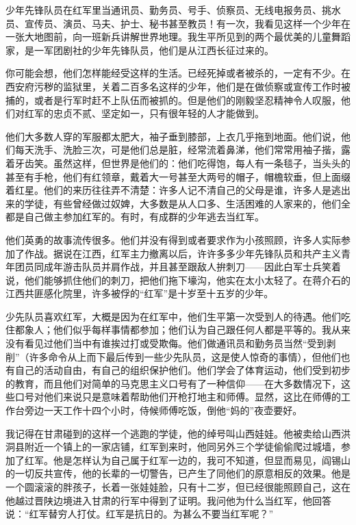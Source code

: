 \documentclass[10pt]{book}
\begin{document}
少年先锋队员在红军里当通讯员、勤务员、号手、侦察员、无线电报务员、挑水员、宣传员、演员、马夫、护士、秘书甚至教员！有一次，我看见这样一个少年在一张大地图前，向一班新兵讲解世界地理。我生平所见到的两个最优美的儿童舞蹈家，是一军团剧社的少年先锋队员，他们是从江西长征过来的。

你可能会想，他们怎样能经受这样的生活。已经死掉或者被杀的，一定有不少。在西安府污秽的监狱里，关着二百多名这样的少年，他们是在做侦察或宣传工作时被捕的，或者是行军时赶不上队伍而被抓的。但是他们的刚毅坚忍精神令人叹服，他们对红军的忠贞不贰、坚定如一，只有很年轻的人才能做到。

他们大多数人穿的军服都太肥大，袖子垂到膝部，上衣几乎拖到地面。他们说，他们每天洗手、洗脸三次，可是他们总是脏，经常流着鼻涕，他们常常用袖子揩，露着牙齿笑。虽然这样，但世界是他们的：他们吃得饱，每人有一条毯子，当头头的甚至有手枪，他们有红领章，戴着大一号甚至大两号的帽子，帽檐软垂，但上面缀着红星。他们的来历往往弄不清楚：许多人记不清自己的父母是谁，许多人是逃出来的学徒，有些曾经做过奴婢，大多数是从人口多、生活困难的人家来的，他们全都是自己做主参加红军的。有时，有成群的少年逃去当红军。

他们英勇的故事流传很多。他们并没有得到或者要求作为小孩照顾，许多人实际参加了作战。据说在江西，红军主力撤离以后，许许多多少年先锋队员和共产主义青年团员同成年游击队员并肩作战，并且甚至跟敌人拚刺刀——因此白军士兵笑着说，他们能够抓住他们的刺刀，把他们拖下壕沟，他实在太小太轻了。在蒋介石的江西共匪感化院里，许多被俘的“红军”是十岁至十五岁的少年。

少先队员喜欢红军，大概是因为在红军中，他们生平第一次受到人的待遇。他们吃住都象人；他们似乎每样事情都参加；他们认为自己跟任何人都是平等的。我从来没有看见过他们当中有谁挨过打或受欺侮。他们做通讯员和勤务员当然“受到剥削”（许多命令从上而下最后传到一些少先队员，这是使人惊奇的事情），但他们也有自己的活动自由，有自己的组织保护他们。他们学会了体育运动，他们受到初步的教育，而且他们对简单的马克思主义口号有了一种信仰——在大多数情况下，这些口号对他们来说只是意味着帮助他们开枪打地主和师傅。显然，这比在师傅的工作台旁边一天工作十四个小时，侍候师傅吃饭，倒他“妈的”夜壶要好。

我记得在甘肃碰到的这样一个逃跑的学徒，他的绰号叫山西娃娃。他被卖给山西洪洞县附近一个镇上的一家店铺，红军到来时，他同另外三个学徒偷偷爬过城墙，参加了红军。他是怎样认为自己属于红军一边的，我可不知道，但显而易见，阎锡山的一切反共宣传，他的长辈的一切警告，已产生了同他们的原意相反的效果。他是一个圆滚滚的胖孩子，长着一张娃娃脸，只有十二岁，但已经很能照顾自己，这在他越过晋陕边境进入甘肃的行军中得到了证明。我问他为什么当红军，他回答说：“红军替穷人打仗。红军是抗日的。为甚么不要当红军呢？”
\end{document}
